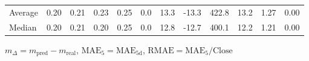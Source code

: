 \begin{threeparttable}
{\begin{tabular}{lrrrrrrrrrrr}
Average &          0.20 &          0.21 &          0.23 &        0.25 &                 0.0 &                13.3 &      -13.3 &               422.8 &             13.2 &            1.27 &                   0.00 \\
 Median &          0.20 &          0.21 &          0.20 &        0.25 &                 0.0 &                12.8 &      -12.7 &               400.1 &             12.2 &            1.21 &                   0.00 \\
\bottomrule
\end{tabular}
}
\begin{tablenotes}\footnotesize
\item $m_\Delta=m_{\text{pred}}-m_{\text{real}}$,
$\mathrm{MAE}_5=\mathrm{MAE}_{5\text{d}}$,
$\mathrm{RMAE}=\mathrm{MAE}_5/\text{Close}$
\end{tablenotes}
\end{threeparttable}
\endgroup

